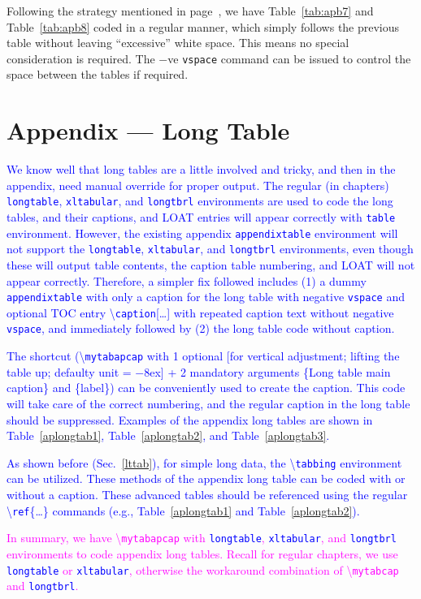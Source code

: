 \documentclass[phd,showframe]{ndsu-thesis-2022}
\newcommand\italk[1]{\textcolor{blue}{#1}}  %
\newcommand\cmd[1]{\textbackslash\texttt{#1}}  %
\newcommand\vb[1]{\textcolor{blue}{\texttt{#1}}}%
\begin{document}
{\color{blue} Following the strategy mentioned in page~\pageref{ttab}, we have Table~\ref{tab:apb7} and Table~\ref{tab:apb8} coded in a regular manner, which simply follows the previous table without leaving ``excessive'' white space. This means no special consideration is required. The $-$ve \texttt{vspace} command can be issued to control the space between the tables if required. 
} 
 

\mysectop
\section{Appendix --- Long Table}
\italk{We know well that long tables are a little involved and tricky, and then in the appendix, need manual override for proper output. The regular (in chapters) \vb{longtable}, \vb{xltabular}, and \vb{longtbrl} environments are used to code the long tables, and their captions, and LOAT entries will appear correctly with \vb{table} environment. However, the existing appendix \vb{appendixtable} environment will not support the \vb{longtable}, \vb{xltabular}, and \vb{longtbrl} environments, even though these will output table contents, the caption table numbering, and LOAT will not appear correctly. Therefore, a simpler fix followed includes (1) a dummy \vb{appendixtable} with only a caption for the long table with negative \vb{vspace} and optional TOC entry \cmd{caption}[\ldots] with repeated caption text without negative \vb{vspace}, and immediately followed by (2) the long table code without caption.} 

\italk{The shortcut (\cmd{mytabapcap} with 1 optional [for vertical adjustment; lifting the table up; defaulty unit = $-8$ex] + 2 mandatory arguments \{Long table main caption\} and \{label\}) can be conveniently used to create the caption. This code will take care of the correct numbering, and the regular caption in the long table should be suppressed. Examples of the appendix long tables are shown in Table~\ref{aplongtab1}, Table~\ref{aplongtab2}, and Table~\ref{aplongtab3}.} 

\italk{As shown before (Sec.~\ref{lttab}), for simple long data, the \cmd{tabbing} environment can be utilized. These methods of the appendix long table can be coded with or without a caption. These advanced tables should be referenced using the regular \cmd{ref}\{\ldots\} commands (e.g., Table~\ref{aplongtab1} and Table~\ref{aplongtab2}).}

\textcolor{magenta}{In summary, we have \cmd{mytabapcap} with \vb{longtable}, \vb{xltabular}, and \vb{longtbrl} environments to code appendix long tables. Recall for regular chapters, we use \vb{longtable} or \vb{xltabular}, otherwise the workaround combination of \cmd{mytabcap} and \vb{longtbrl}.}  
\end{document}

